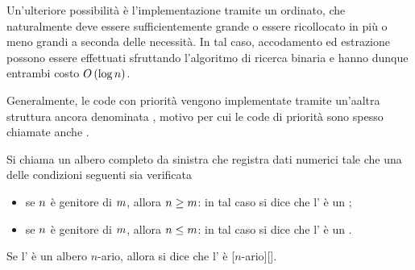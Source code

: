 \par Un'ulteriore possibilit\`a \`e l'implementazione tramite un 
ordinato, che naturalmente deve essere sufficientemente grande o essere
ricollocato in  pi\`u o meno grandi a seconda delle necessit\`a.
In tal caso, accodamento ed estrazione possono essere effettuati sfruttando
l'algoritmo di ricerca binaria e hanno dunque entrambi costo $O \left ( \log n \right )$.
\par Generalmente, le code con priorit\`a vengono implementate tramite un'aaltra
struttura ancora denominata , motivo per cui le code di priorit\`a
sono spesso chiamate anche .
\begin{Definition}
  Si chiama  un albero completo da sinistra che registra
  dati numerici tale che una delle condizioni seguenti sia verificata
  \begin{itemize}
    \item se $n$ \`e genitore di $m$, allora 
      $n \geq m$: in tal caso si dice che l'
      \`e un ;
    \item se $n$ \`e genitore di $m$, allora 
      $n \leq m$: in tal caso si dice che l'
      \`e un .
  \end{itemize}
  Se l' \`e un albero $n$-ario, allora si dice che
  l' \`e [$n$-ario][].
\end{Definition}
